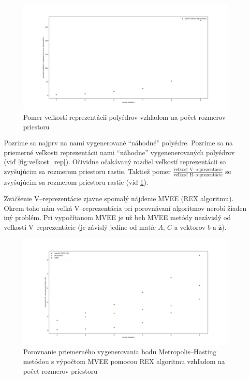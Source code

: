 \begin{figure} [H]
	\includegraphics[width=\linewidth]{images/pomer_rep.png}
	\caption{Pomer veľkostí reprezentácii polyédrov vzhľadom na počet rozmerov priestoru}
	\label{fig:pomer_rep}
\end{figure}

Pozrime sa najprv na nami vygenerované ``náhodné'' polyédre. Pozrime sa na priemerné veľkosti reprezentácii nami ``náhodne'' vygenenerovaných polyédrov (viď \ref{fig:velkost_rep}). Očividne očakávaný rozdiel veľkostí reprezentácii so zvyšujúcim sa rozmerom priestoru rastie. Taktiež pomer $\frac{\text{veľkosť V--reprezentácie}}{\text{veľkosť H--reprezentácie}}$ so zvyšujúcim sa rozmerom priestoru rastie (viď \ref{fig:pomer_rep}).

Zväčšenie V--reprezentácie zjavne spomalý nájdenie MVEE (REX algoritmu). Okrem toho nám veľká V--reprezentácia pri porovnávaní algoritmov nerobí žiaden iný problém. Pri vypočítanom MVEE je už beh MVEE metódy nezávislý od veľkosti V--reprezentácie (je závislý jedine od matíc $A$, $C$ a vektorov $b$ a $\mathbf{\overline z}$).\\

\begin{figure} [H]
	\includegraphics[width=\linewidth]{images/mh_rex.png}
	\caption{Porovnanie priemerného vygenerovania bodu Metropolis--Hasting metódou s výpočtom MVEE pomocou REX algoritmu vzhľadom na počet rozmerov priestoru}
	\label{fig:mh_rex}
\end{figure}

